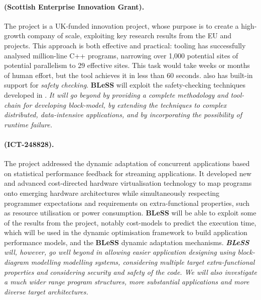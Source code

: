 \documentclass[a4paper,11pt]{article}
\newcommand{\project}[1]{\textbf{#1}\xspace}
\newcommand{\BLESS}{\project{BLeSS}}
\newcommand{\TheProject}{\BLESS}
\begin{document}
\vspace{-2pt}
\paragraph{\paraformance (Scottish Enterprise Innovation Grant).}
The \paraformance{} project is a UK-funded innovation project, whose purpose is to create
a high-growth company of scale, exploiting key research results from the EU \paraphrase and \rephrase
projects.
 This \paraformance{} approach is both effective and practical: \paraformance{} tooling has successfully analysed million-line C++ programs,
 narrowing over 1,000 potential sites of potential parallelism to 29 effective sites.
 This task would take weeks or months of human effort, but the \paraformance{} tool achieves it
 in less than 60 seconds. \paraformance also has built-in support for \emph{safety checking}. %
%
\TheProject{} will exploit the safety-checking techniques developed in \paraformance.
\emph{It will go beyond \paraformance by  providing a complete methodology and tool-chain for developing block-model,
by extending the techniques to complex distributed, data-intensive applications, and by incorporating the
possibility of runtime failure.} 

\paragraph{\advanceproject (ICT-248828).}
% 
% 
The \advanceproject project addressed the dynamic adaptation of concurrent applications 
based on statistical performance feedback for streaming applications.  
It developed new and advanced cost-directed hardware
virtualisation technology to map programs onto emerging hardware
architectures
while simultaneously respecting programmer
expectations and requirements on extra-functional properties, such as
resource utilisation or power consumption.
%
\TheProject{} will be able to exploit some of the results from the \advanceproject project, notably  cost-models to predict the execution time, which will be used in 
the dynamic optimisation framework to build application performance models, and the \TheProject{} dynamic adaptation mechanisms.
\emph{\TheProject{} will, however, go well beyond \advanceproject in allowing easier
application designing using block-diagram modelling modelling systems, considering multiple
target extra-functional properties and considering security and safety of the code.
We will also investigate a much wider range program structures,
more substantial applications and more diverse target architectures.
}
\end{document}
